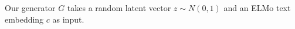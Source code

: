 Our generator $G$ takes a random latent vector $z \sim N(0, 1)$ and an ELMo text embedding $c$ as input. 